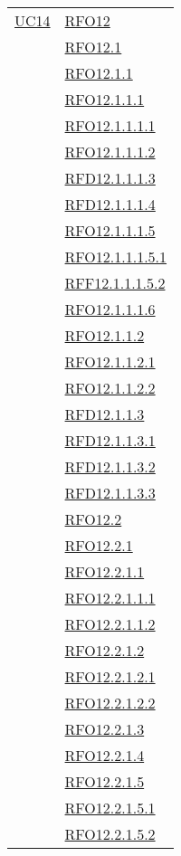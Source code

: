 \begin{longtable}{|>{\centering}m{5cm}|m{5cm}<{\centering}|}
\hyperlink{UC14}{UC14} 
& \hyperlink{RFO12}{RFO12}\\
& \hyperlink{RFO12.1}{RFO12.1}\\
& \hyperlink{RFO12.1.1}{RFO12.1.1}\\
& \hyperlink{RFO12.1.1.1}{RFO12.1.1.1}\\
& \hyperlink{RFO12.1.1.1.1}{RFO12.1.1.1.1}\\
& \hyperlink{RFO12.1.1.1.2}{RFO12.1.1.1.2}\\
& \hyperlink{RFD12.1.1.1.3}{RFD12.1.1.1.3}\\
& \hyperlink{RFD12.1.1.1.4}{RFD12.1.1.1.4}\\
& \hyperlink{RFO12.1.1.1.5}{RFO12.1.1.1.5}\\
& \hyperlink{RFO12.1.1.1.5.1}{RFO12.1.1.1.5.1}\\
& \hyperlink{RFF12.1.1.1.5.2}{RFF12.1.1.1.5.2}\\
& \hyperlink{RFO12.1.1.1.6}{RFO12.1.1.1.6}\\
& \hyperlink{RFO12.1.1.2}{RFO12.1.1.2}\\
& \hyperlink{RFO12.1.1.2.1}{RFO12.1.1.2.1}\\
& \hyperlink{RFO12.1.1.2.2}{RFO12.1.1.2.2}\\
& \hyperlink{RFD12.1.1.3}{RFD12.1.1.3}\\
& \hyperlink{RFD12.1.1.3.1}{RFD12.1.1.3.1}\\
& \hyperlink{RFD12.1.1.3.2}{RFD12.1.1.3.2}\\
& \hyperlink{RFD12.1.1.3.3}{RFD12.1.1.3.3}\\
& \hyperlink{RFO12.2}{RFO12.2}\\
& \hyperlink{RFO12.2.1}{RFO12.2.1}\\
& \hyperlink{RFO12.2.1.1}{RFO12.2.1.1}\\
& \hyperlink{RFO12.2.1.1.1}{RFO12.2.1.1.1}\\
& \hyperlink{RFO12.2.1.1.2}{RFO12.2.1.1.2}\\
& \hyperlink{RFO12.2.1.2}{RFO12.2.1.2}\\
& \hyperlink{RFO12.2.1.2.1}{RFO12.2.1.2.1}\\
& \hyperlink{RFO12.2.1.2.2}{RFO12.2.1.2.2}\\
& \hyperlink{RFO12.2.1.3}{RFO12.2.1.3}\\
& \hyperlink{RFO12.2.1.4}{RFO12.2.1.4}\\
& \hyperlink{RFO12.2.1.5}{RFO12.2.1.5}\\
& \hyperlink{RFO12.2.1.5.1}{RFO12.2.1.5.1}\\
& \hyperlink{RFO12.2.1.5.2}{RFO12.2.1.5.2}\\\hline


\end{longtable}
